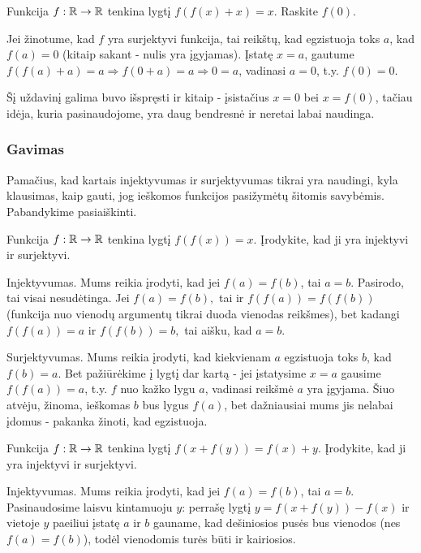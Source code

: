 \begin{pav}
Funkcija $f:\mathbb R \to \mathbb R$ tenkina lygtį $f(f(x)+x) = x$. Raskite $f(0)$.
\end{pav}

Jei žinotume, kad $f$ yra surjektyvi funkcija, tai reikštų, kad egzistuoja
toks $a$, kad $f(a)=0$ (kitaip sakant - nulis yra įgyjamas). Įstatę $x
= a$, gautume $f(f(a)+a)= a \Rightarrow f(0+a)=a \Rightarrow 0 =a$,
vadinasi $a = 0$, t.y. $f(0)=0$.

Šį uždavinį galima buvo išspręsti ir kitaip - įsistačius $x=0$ bei
$x=f(0)$, tačiau idėja, kuria pasinaudojome, yra daug bendresnė ir neretai
labai naudinga.

\subsubsection{Gavimas}
\bigskip

Pamačius, kad kartais injektyvumas ir surjektyvumas tikrai yra naudingi,
kyla klausimas, kaip gauti, jog ieškomos funkcijos pasižymėtų šitomis
savybėmis. Pabandykime pasiaiškinti.

\begin{pav}
Funkcija $f:\mathbb R \to \mathbb R$ tenkina lygtį $f(f(x)) = x$. Įrodykite, kad ji yra
injektyvi ir surjektyvi.
\end{pav}

Injektyvumas. Mums reikia įrodyti, kad jei $f(a)=f(b)$, tai $a=b$. Pasirodo,
tai visai nesudėtinga. Jei $f(a)=f(b),$ tai ir $f(f(a))=f(f(b))$ (funkcija
nuo vienodų argumentų tikrai duoda vienodas reikšmes), bet kadangi
$f(f(a))=a$ ir $f(f(b))=b,$ tai aišku, kad $a=b.$


Surjektyvumas. Mums reikia įrodyti, kad kiekvienam $a$ egzistuoja toks $b$,
kad $f(b)=a$. Bet pažiūrėkime į lygtį dar kartą - jei įstatysime $x=a$
gausime $f(f(a))=a$, t.y. $f$ nuo kažko lygu $a$, vadinasi reikšmė $a$ yra
įgyjama. Šiuo atvėju, žinoma, ieškomas $b$ bus lygus $f(a)$, bet
dažniausiai mums jis nelabai įdomus - pakanka žinoti, kad egzistuoja.

\begin{pav}
Funkcija $f:\mathbb R \to \mathbb R$ tenkina lygtį $f(x +f(y)) = f(x) + y$. Įrodykite,
kad ji yra injektyvi ir surjektyvi.
\end{pav}

Injektyvumas. Mums reikia įrodyti, kad jei $f(a)=f(b)$, tai $a=b$.
Pasinaudosime laisvu kintamuoju $y$: perrašę lygtį $y=f(x+f(y))-f(x)$
ir vietoje $y$ paeiliui įstatę $a$ ir $b$ gauname, kad dešiniosios pusės
bus vienodos (nes $f(a)=f(b)$), todėl vienodomis turės būti ir kairiosios.

